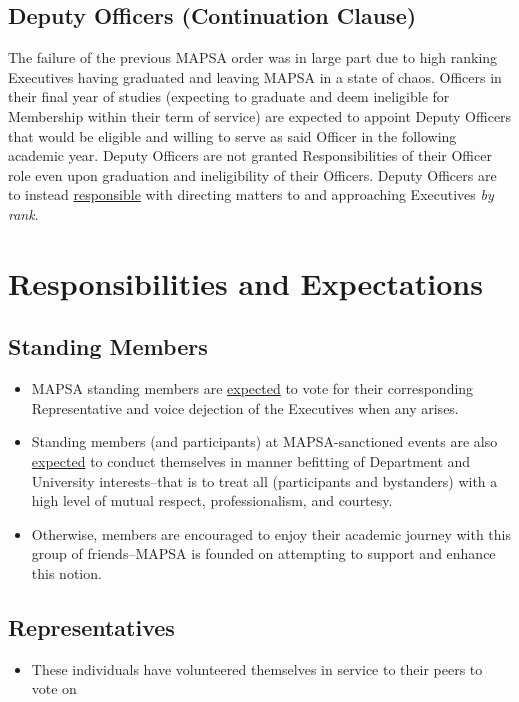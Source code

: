\documentclass[8pt]{article}
\begin{document}
	\subsection{Deputy Officers (Continuation Clause)}\label{subsec:dep}
	The failure of the previous MAPSA order was in large part due to high ranking Executives having graduated and leaving MAPSA in a state of chaos. Officers in their final year of studies (expecting to graduate and deem ineligible for Membership within their term of service) are {expected} to appoint Deputy Officers that would be eligible and willing to serve as said Officer in the following academic year. Deputy Officers are not granted Responsibilities of their Officer role even upon graduation and ineligibility of their Officers. Deputy Officers are to instead \underline{responsible} with directing matters to and approaching Executives \textit{by rank}.
	\section{Responsibilities and Expectations}
	\subsection{Standing Members}
	\begin{itemize}
		\item MAPSA standing members are \underline{expected} to vote for their corresponding Representative and voice dejection of the Executives when any arises. 
		\item Standing members (and participants) at MAPSA-sanctioned events are also \underline{expected} to conduct themselves in manner befitting of Department and University interests--that is to treat all (participants and bystanders) with a high level of mutual respect, professionalism, and courtesy. 
		\item Otherwise, members are encouraged to enjoy their academic journey with this group of friends--MAPSA is founded on attempting to support and enhance this notion.
	\end{itemize}
	\subsection{Representatives}
	\begin{itemize}
		\item These individuals have volunteered themselves in service to their peers to vote on
	\end{itemize}
\end{document}
